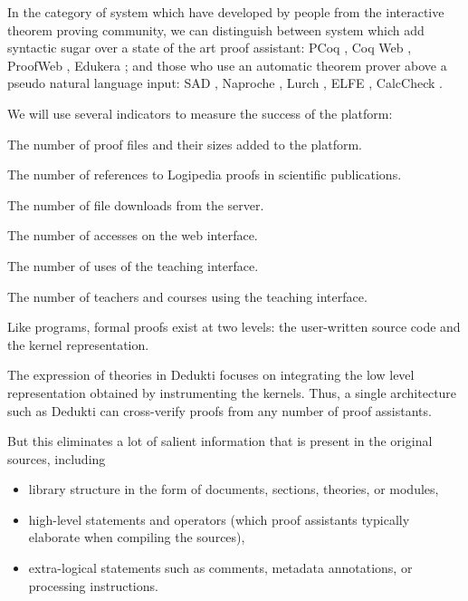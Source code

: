 In the category of system which have developed by people from the interactive theorem proving community, we can distinguish between system which add syntactic sugar over a state of the art proof assistant:
PCoq \cite{amerkad_mathematics_2001}, Coq Web \cite{blanc_proofs_2007}, ProofWeb \cite{kaliszyk_deduction_2008}, Edukera \cite{rognier_presentation_2016}; and those who use an automatic theorem prover above a pseudo natural language input:
SAD \cite{lyaletski_sad_2006}, Naproche \cite{cramer_naproche_2010}, Lurch \cite{carter_lurch:_nodate}, ELFE \cite{dore_elfe_2018}, CalcCheck \cite{kahl_calccheck:_2018}.



We will use several indicators to measure the success of the platform:
\begin{compactitem}
\item The number of proof files and their sizes added to the platform.
\item The number of references to Logipedia proofs in scientific
  publications.
\item The number of file downloads from the server.
\item The number of accesses on the web interface.
\item The number of uses of the teaching interface.
\item The number of teachers and courses using the teaching interface.
\end{compactitem}


Like programs, formal proofs exist at two levels: the user-written
source code and the kernel representation.

The expression of theories in Dedukti focuses on integrating the low
level representation obtained by instrumenting the kernels.  Thus, a
single architecture such as Dedukti can cross-verify proofs from any
number of proof assistants.

But this eliminates a lot of salient information that is present in
the original sources, including
\begin{itemize}
\item library structure in the form of documents, sections,
  theories, or modules,

\item high-level statements and operators (which proof assistants
  typically elaborate when compiling the sources),

\item extra-logical statements such as comments, metadata annotations,
  or processing instructions.
\end{itemize}

